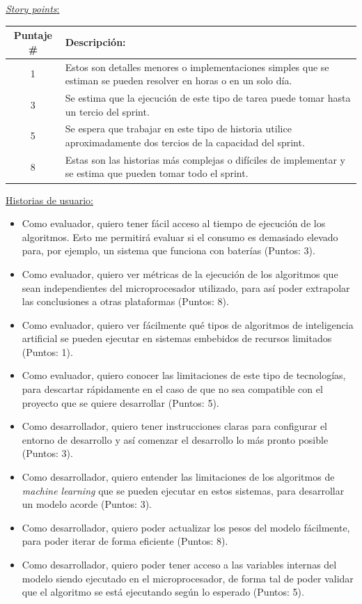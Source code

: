\documentclass[
11pt, %
codirector, %
]{charter}
\begin{document}
\underline{\textit{Story points}:} 
\begin{table}[h]
\centering
\renewcommand{\tabularxcolumn}{m} %

\begin{tabularx}{\textwidth}{|c|>{\raggedright}X|}
\hline
\textbf{Puntaje \#} & \textbf{Descripción:} \tabularnewline
\hline
1 & Estos son detalles menores o implementaciones simples que se estiman se pueden resolver en horas o en un solo día.\tabularnewline
\hline
3 & Se estima que la ejecución de este tipo de tarea puede tomar hasta un tercio del sprint. \tabularnewline
\hline
5 & Se espera que trabajar en este tipo de historia utilice aproximadamente dos tercios de la capacidad del sprint. \tabularnewline
\hline
8 & Estas son las historias más complejas o difíciles de implementar y se estima que pueden tomar todo el sprint. \tabularnewline
\hline
\end{tabularx}
\end{table}


\underline{Historias de usuario:} 
\begin{itemize}
\item Como evaluador, quiero tener fácil acceso al tiempo de ejecución de los algoritmos. Esto me permitirá evaluar si el consumo es demasiado elevado para, por ejemplo, un sistema que funciona con baterías (Puntos: 3).
\item Como evaluador, quiero ver métricas de la ejecución de los algoritmos que sean independientes del microprocesador utilizado, para así poder extrapolar las conclusiones a otras plataformas (Puntos: 8).
\item Como evaluador, quiero ver fácilmente qué tipos de algoritmos de inteligencia artificial se pueden ejecutar en sistemas embebidos de recursos limitados  (Puntos: 1).
\item Como evaluador, quiero conocer las limitaciones de este tipo de tecnologías, para descartar rápidamente en el caso de que no sea compatible con el proyecto que se quiere desarrollar  (Puntos: 5).
\item Como desarrollador, quiero tener instrucciones claras para configurar el entorno de desarrollo y así comenzar el desarrollo lo más pronto posible  (Puntos: 3).
\item Como desarrollador, quiero entender las limitaciones de los algoritmos de \textit{machine learning} que se pueden ejecutar en estos sistemas, para desarrollar un modelo acorde (Puntos: 3).
\item Como desarrollador, quiero poder actualizar los pesos del modelo fácilmente, para poder iterar de forma eficiente  (Puntos: 8).
\item Como desarrollador, quiero poder tener acceso a las variables internas del modelo siendo ejecutado en el microprocesador, de forma tal de poder validar que el algoritmo se está ejecutando según lo esperado (Puntos: 5).
\end{itemize}
\end{document}

